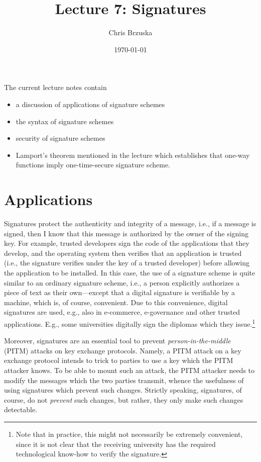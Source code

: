 \documentclass[a4paper,table,dvipsnames]{article}
\title{Lecture 7: Signatures}
\author{Chris Brzuska}
\date{\today}
\theoremstyle{definition}
\begin{document}
\maketitle
The current lecture notes contain
\begin{itemize}
\item a discussion of applications of signature schemes
\item the syntax of signature schemes
\item security of signature schemes
\item Lamport's theorem mentioned in the lecture which establishes that one-way functions
imply one-time-secure signature scheme.
\end{itemize}

\section{Applications}
Signatures protect the authenticity and integrity of a message, i.e., if a message is signed,
then I know that this message is authorized by the owner of the signing key. For example, trusted
developers sign the code of the applications that they develop, and the operating system then
verifies that an application is trusted (i.e., the signature verifies under the key of a 
trusted developer) before allowing the application to be installed. In this case, the use
of a signature scheme is quite similar to an ordinary signature scheme, i.e., a person
explicitly authorizes a piece of text as their own---except that a digital signature is
verifiable by a machine, which is, of course, convenient. Due to this convenience, digital signatures
are used, e.g., also in e-commerce, e-governance and other trusted applications. E.g., some universities
digitally sign the diplomas which they issue.\footnote{Note that in practice, this might not necessarily
be extremely convenient, since it is not clear that the receiving university has the required
technological know-how to verify the signature.}

Moreover, signatures are an essential tool to prevent \emph{person-in-the-middle} (PITM) attacks
on key exchange protocols. Namely, a PITM attack on a key exchange protocol intends to trick to
parties to use a key which the PITM attacker knows. To be able to mount such an attack, the PITM
attacker needs to modify the messages which the two parties transmit, whence the usefulness of
using signatures which prevent such changes. Strictly speaking, signatures, of course, do not
\emph{prevent} such changes, but rather, they only make such changes detectable.
\end{document}
